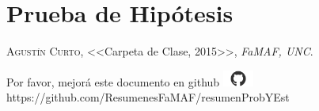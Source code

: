 \documentclass[12pt,a4paper]{report}
\begin{document}
\chapter{Prueba de Hipótesis}



\begin{thebibliography}{X}
 \textsc{Agustín Curto},
<<Carpeta de Clase, 2015>>,
\textit{FaMAF, UNC}.
\end{thebibliography}

\vspace{\fill}
\begin{center}
Por favor, mejorá este documento en github
\includegraphics[width=1cm]{graphics/github.png} \\
https://github.com/ResumenesFaMAF/resumenProbYEst
\end{center}
\end{document}
